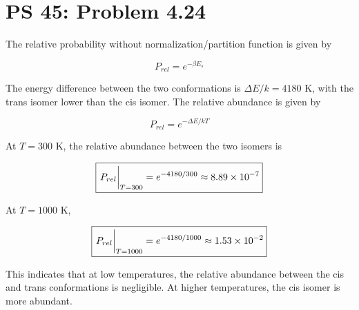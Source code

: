 \documentclass[12pt,a4paper]{article}
\begin{document}
\setcounter{page}{1}

\section*{PS 45: Problem 4.24}
\bigskip

The relative probability without normalization/partition function is given by

\begin{equation}
	P_{rel} = e^{-\beta E_s} \label{eq:given-p}
\end{equation}

The energy difference between the two conformations is $\Delta E/k = 4180$ K, with the trans isomer lower than the cis isomer. The relative abundance is given by

\begin{equation}
	P_{rel} = e^{-\Delta E/kT} \label{eq:given-prel}
\end{equation}

At $T = 300$ K, the relative abundance between the two isomers is

\begin{equation}
	\boxed{
		\eval{P_{rel}}_{T=300} = e^{-4180/300} \approx  8.89 \times 10^{-7}
	}
\end{equation}

At $T = 1000$ K,

\begin{equation}
	\boxed{
		\eval{P_{rel}}_{T=1000} = e^{-4180/1000} \approx 1.53 \times 10^{-2}
	}
\end{equation}

This indicates that at low temperatures, the relative abundance between the cis and trans conformations is negligible. At higher temperatures, the cis isomer is more abundant.
\end{document}
